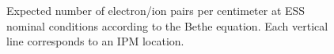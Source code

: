\begin{figure}[!ht]
	
	\caption[Expected number of electron/ion pairs per centimeter at ESS nominal conditions according to the Bethe equation]{Expected number of electron/ion pairs per centimeter at ESS nominal conditions according to the Bethe equation. Each vertical line corresponds to an IPM location.}
	\label{chap3:ess_primary_particles}
\end{figure}
